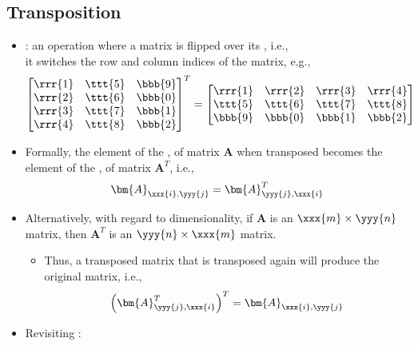 \begin{itemize}
  \subsection{Transposition}\label{Transposition}
  \begin{itemize}
    \item {}: an operation where a matrix is flipped over its \hyperref[Diagonal]{}, i.e., \\ it switches the row and column indices of the matrix, e.g., 
    \[%
    \begin{bmatrix}
    \rrr{1} & \ttt{5} & \bbb{9} \\
    \rrr{2} & \ttt{6} & \bbb{0} \\
    \rrr{3} & \ttt{7} & \bbb{1} \\
    \rrr{4} & \ttt{8} & \bbb{2}
    \end{bmatrix}^T
    =
    \begin{bmatrix}
    \rrr{1} & \rrr{2} & \rrr{3} & \rrr{4} \\
    \ttt{5} & \ttt{6} & \ttt{7} & \ttt{8} \\
    \bbb{9} & \bbb{0} & \bbb{1} & \bbb{2}
    \end{bmatrix}
    \]%
    \item Formally, the element of the ,  of matrix \(\bm{A}\) when transposed becomes the element of the ,  of matrix \(\bm{A}^T\), i.e.,
    \[%
    \bm{A}_{\xxx{i},\yyy{j}} = \bm{A}_{\yyy{j},\xxx{i}}^T
    \]%
    \item Alternatively, with regard to dimensionality, if \(\bm{A}\) is an \(\xxx{m} \times \yyy{n}\) matrix, then \(\bm{A}^T\) is an \(\yyy{n} \times \xxx{m}\) matrix. 
      \begin{itemize}
        \item Thus, a transposed matrix that is transposed again will produce the original matrix, i.e.,
        \[%
        \left(\bm{A}_{\yyy{j},\xxx{i}}^T\right)^T = \bm{A}_{\xxx{i},\yyy{j}} %
        \]%
      \end{itemize}
    \item Revisiting \hyperref[Augmented and Complex Matrices]{}:
    \begin{itemize}

\end{itemize}
\end{itemize}
\end{itemize}
